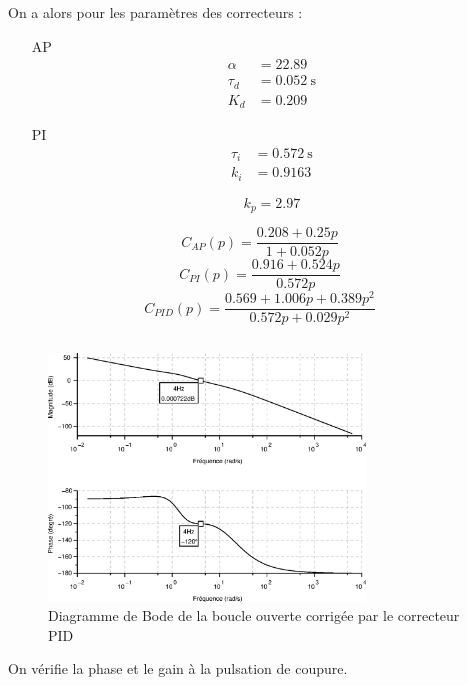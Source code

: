 On a alors pour les paramètres des correcteurs :
\begin{itemize}
    \item[AP] 
        \begin{align*}
            \alpha&=22.89\\
            \tau_d&=\SI{0.052}{\second}\\
            K_d&=0.209
        \end{align*}
    \item[PI]
        \begin{align*}
            \tau_i&=\SI{0.572}{\second}\\
            k_i&=0.9163
        \end{align*}

\[
    k_p=2.97
\]
\end{itemize}
\[
    C_{AP}(p)=\dfrac{0.208 + 0.25p}{1+0.052p}
\]
\[
    C_{PI}(p)=\dfrac{0.916 + 0.524p}{0.572p}
\]
\[
    C_{PID}(p)=\dfrac{0.569+1.006p+0.389p^2}{0.572p+ 0.029p^2}  
\]
\inputminted{scilab}{scilab/code_q16_chap_correction.sce}
\begin{figure}
    \centering
    \includegraphics[width=0.75\textwidth]{fig/chap_correction/bode_BOCPID.eps}
    \caption{Diagramme de Bode de la boucle ouverte corrigée par 
    le correcteur PID}
\end{figure}
On vérifie la phase et le gain à la pulsation de coupure.
